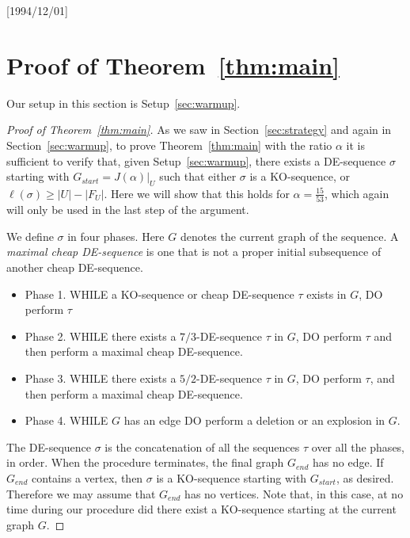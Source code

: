 \NeedsTeXFormat{LaTeX2e}[1994/12/01]\documentclass[letterpaper, 11pt]{article}
\theoremstyle{definition}
\theoremstyle{remark}
\numberwithin{equation}{section}
\begin{document}
    
\section{Proof of Theorem~\ref{thm:main}} \label{sec:mainproof}
 
Our setup in this section is Setup~\ref{sec:warmup}.

\begin{proof}[Proof of Theorem~\ref{thm:main}]
 As we saw in Section~\ref{sec:strategy} and again in
 Section~\ref{sec:warmup}, to prove Theorem~\ref{thm:main} with the
 ratio $\alpha$ it is
 sufficient to verify that, given Setup~\ref{sec:warmup}, there
 exists a DE-sequence $\sigma$ 
starting with $G_{start} = J(\alpha)|_U$ such that either $\sigma$ is
a KO-sequence, or $\ell(\sigma ) \geq |U|-|F_U|$. 
Here we will show that this holds for $\alpha= \frac{15}{53}$, which again will only be used in the last step of the argument. 


We define $\sigma$ in four phases.
Here $G$ denotes the current graph of the sequence. 
A {\em maximal cheap DE-sequence} is one that is not a proper initial subsequence of another cheap DE-sequence. 

\begin{itemize}
\item Phase 1. {\small WHILE} a KO-sequence or
  cheap DE-sequence $\tau$ exists in $G$,
  {\small DO} perform $\tau$
\item Phase 2. 
{\small WHILE} there exists a $7/3$-DE-sequence $\tau$ in $G$, {\small DO} 
                perform $\tau$ and then perform a maximal cheap
                DE-sequence.
\item Phase 3. 
{\small WHILE} there exists a $5/2$-DE-sequence $\tau$ in $G$, {\small DO} 
                perform $\tau$, and then perform a maximal cheap DE-sequence. 
\item Phase 4. {\small WHILE} $G$ has an edge {\small DO} perform a deletion or an
  explosion in $G$.
    \end{itemize}
The DE-sequence $\sigma$ is the concatenation of all the sequences $\tau$ over all the phases, in order.    When the procedure terminates, the final graph $G_{end}$ has no edge.
    If $G_{end}$ contains a vertex, then $\sigma$ is a
KO-sequence starting with $G_{start}$, as desired.
Therefore we may assume that $G_{end}$ has no vertices. Note that, in
this case, at no time during our procedure did there exist a KO-sequence starting at the current graph $G$.
    

\end{proof}
\end{document}
